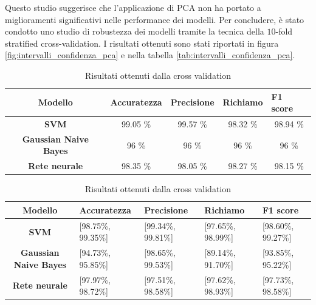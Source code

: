 Questo studio suggerisce che l'applicazione di PCA non ha portato a miglioramenti
significativi nelle performance dei modelli.
\newpage
Per concludere, è stato condotto uno studio di robustezza dei modelli tramite
la tecnica della $10$-fold stratified cross-validation. I risultati ottenuti
sono stati riportati in figura \ref{fig:intervalli_confidenza_pca} e nella
tabella \ref{tab:intervalli_confidenza_pca}.
\begin{table}[!ht]
    \begin{subtable}[h]{1\textwidth}
        \centering
        \begin{tabular}{@{}cllll@{}}
            \toprule
            \rowcolor[HTML]{EFEFEF}
            \textbf{Modello}                                      & \textbf{Accuratezza}         & \textbf{Precisione}          & \textbf{Richiamo}            & \textbf{F1 score}            \\ \midrule
            \cellcolor[HTML]{EFEFEF}\textbf{SVM}                  & \multicolumn{1}{c}{99.05 \%} & \multicolumn{1}{c}{99.57 \%} & \multicolumn{1}{c}{98.32 \%} & \multicolumn{1}{c}{98.94 \%} \\
            \cellcolor[HTML]{EFEFEF}\textbf{Gaussian Naive Bayes} & \multicolumn{1}{c}{96 \%}    & \multicolumn{1}{c}{96 \%}    & \multicolumn{1}{c}{96 \%}    & \multicolumn{1}{c}{96 \%}    \\
            \cellcolor[HTML]{EFEFEF}\textbf{Rete neurale}         & \multicolumn{1}{c}{98.35 \%} & \multicolumn{1}{c}{98.05 \%} & \multicolumn{1}{c}{98.27 \%} & \multicolumn{1}{c}{98.15 \%} \\ \bottomrule
        \end{tabular}
        \caption{Valore medio delle metriche ottenute dalla cross validation}
        \label{tab:risultati_cross_val_pca}
    \end{subtable}
    \hfill
    \begin{subtable}[h]{1\textwidth}
        \centering
        \begin{tabular}{@{}cllll@{}}
            \toprule
            \rowcolor[HTML]{EFEFEF}
            \textbf{Modello}                                      & \textbf{Accuratezza} & \textbf{Precisione} & \textbf{Richiamo}  & \textbf{F1 score}  \\ \midrule
            \cellcolor[HTML]{EFEFEF}\textbf{SVM}                  & [98.75\%, 99.35\%]   & [99.34\%, 99.81\%]  & [97.65\%, 98.99\%] & [98.60\%, 99.27\%] \\
            \cellcolor[HTML]{EFEFEF}\textbf{Gaussian Naive Bayes} & [94.73\%, 95.85\%]   & [98.65\%, 99.53\%]  & [89.14\%, 91.70\%] & [93.85\%, 95.22\%] \\
            \cellcolor[HTML]{EFEFEF}\textbf{Rete neurale}         & [97.97\%, 98.72\%]   & [97.51\%, 98.58\%]  & [97.62\%, 98.93\%] & [97.73\%, 98.58\%] \\ \bottomrule
        \end{tabular}
        \caption{Intervalli di confidenza delle metriche ottenute dalla cross validation}
        \label{tab:intervalli_confidenza_pca}
    \end{subtable}
    \caption{Risultati ottenuti dalla cross validation}
    \label{tab:media_intervalli_confidenza_pca}
\end{table}

